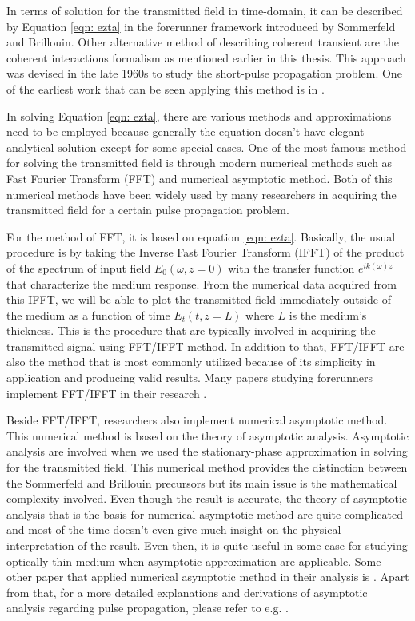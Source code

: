 In terms of solution for the transmitted field in time-domain, it can be described by Equation \ref{eqn: ezta} in the forerunner framework introduced by Sommerfeld and Brillouin. Other alternative method of describing coherent transient are the coherent interactions formalism as mentioned earlier in this thesis. This approach was devised in the late 1960s to study the short-pulse propagation problem. One of the earliest work that can be seen applying this method is in .

In solving Equation \ref{eqn: ezta}, there are various methods and approximations need to be employed because generally the equation doesn't have elegant analytical solution except for some special cases. One of the most famous method for solving the transmitted field  is through modern numerical methods such as Fast Fourier Transform (FFT) and numerical asymptotic method. Both of this numerical methods have been widely used by many researchers in acquiring the transmitted field for a certain pulse propagation problem.

For the method of FFT, it is based on equation \ref{eqn: ezta}. Basically, the usual procedure is by taking the Inverse Fast Fourier Transform (IFFT) of the product of the spectrum of input field $E_{0}(\omega, z = 0)$ with the transfer function $e^{i k(\omega) z}$ that characterize the medium response. From the numerical data acquired from this IFFT, we will be able to plot the transmitted field immediately outside of the medium as a function of time $E_{t}(t, z = L)$ where $L$ is the medium's thickness. This is the procedure that are typically involved in acquiring the transmitted signal using FFT/IFFT method. In addition to that, FFT/IFFT are also the method that is most commonly utilized because of its simplicity in application and producing valid results. Many papers studying forerunners implement FFT/IFFT in their research \cite{Chen2010, Macke2013, MacKe2009, Oughstun2010, Wei2009, Jeong2008, jeong2010slow}.

Beside FFT/IFFT, researchers also implement numerical asymptotic method. This numerical method is based on the theory of asymptotic analysis. Asymptotic analysis are involved when we used the stationary-phase approximation in solving for the transmitted field. This numerical method provides the distinction between the Sommerfeld and Brillouin precursors but its main issue is the mathematical complexity involved. Even though the result is accurate, the theory of asymptotic analysis that is the basis for numerical asymptotic method are quite complicated and most of the time doesn't even give much insight on the physical interpretation of the result. Even then, it is quite useful in some case for studying optically thin medium when asymptotic approximation are applicable. Some other paper that applied numerical asymptotic method in their analysis is . Apart from that, for a more detailed explanations and derivations of asymptotic analysis regarding pulse propagation, please refer to e.g. .


